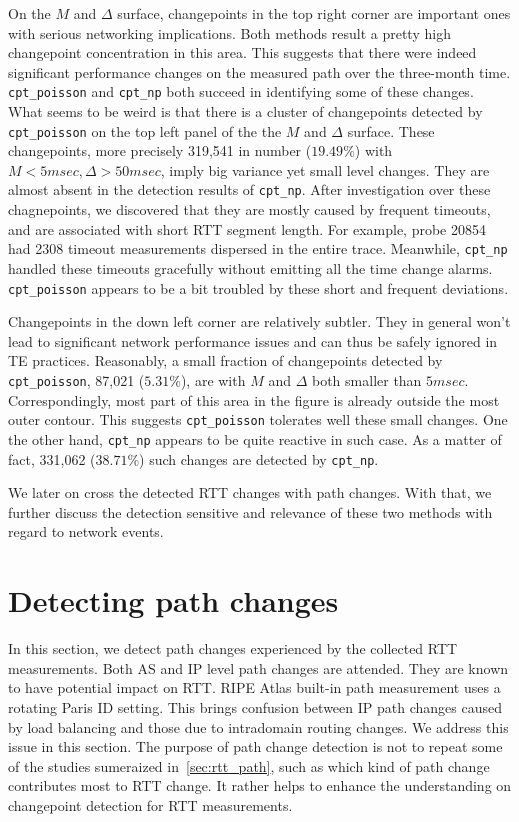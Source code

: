 On the $M$ and $\Delta$ surface, changepoints in the top right corner are important ones with serious networking implications.
Both methods result a pretty high changepoint concentration in this area.
This suggests that there were indeed significant performance changes on the measured path over the three-month time.
\texttt{cpt\_poisson} and \texttt{cpt\_np} both succeed in identifying some of these changes.
What seems to be weird is that there is a cluster of changepoints detected by \texttt{cpt\_poisson} on the top left panel of the the $M$ and $\Delta$ surface.
These changepoints, more precisely 319,541 in number ($19.49\%$) with $M<5msec, \Delta>50msec$, imply big variance yet small level changes.
They are almost absent in the detection results of \texttt{cpt\_np}.
After investigation over these chagnepoints, we discovered that they are mostly caused by frequent timeouts, and are associated with short RTT segment length. For example, probe 20854 had 2308 timeout measurements dispersed in the entire trace.
Meanwhile, \texttt{cpt\_np} handled these timeouts gracefully without emitting all the time change alarms.
\texttt{cpt\_poisson} appears to be a bit troubled by these short and frequent deviations.

Changepoints in the down left corner are relatively subtler.
They in general won't lead to significant network performance issues and can thus be safely ignored in TE practices.
Reasonably, a small fraction of changepoints detected by \texttt{cpt\_poisson}, 87,021 ($5.31\%$), are with $M$ and $\Delta$ both smaller than $5msec$.
Correspondingly, most part of this area in the figure is already outside the most outer contour.
This suggests \texttt{cpt\_poisson} tolerates well these small changes.
One the other hand, \texttt{cpt\_np} appears to be quite reactive in such case.
As a matter of fact, 331,062 ($38.71\%$) such changes are detected by \texttt{cpt\_np}.

We later on cross the detected RTT changes with path changes.
With that, we further discuss the detection sensitive and relevance of these two methods with regard to network events.

\section{Detecting path changes}
\label{sec:path}

In this section, we detect path changes experienced by the collected RTT measurements.
Both AS and IP level path changes are attended.
They are known to have potential impact on RTT.
RIPE Atlas built-in path measurement uses a rotating Paris ID setting.
This brings confusion between IP path changes caused by load balancing and those due to intradomain routing changes.
We address this issue in this section.
The purpose of path change detection is not to repeat some of the studies sumeraized in~\ref{sec:rtt_path}, 
such as which kind of path change contributes most to RTT change.
It rather helps to enhance the understanding on changepoint detection for RTT measurements.


